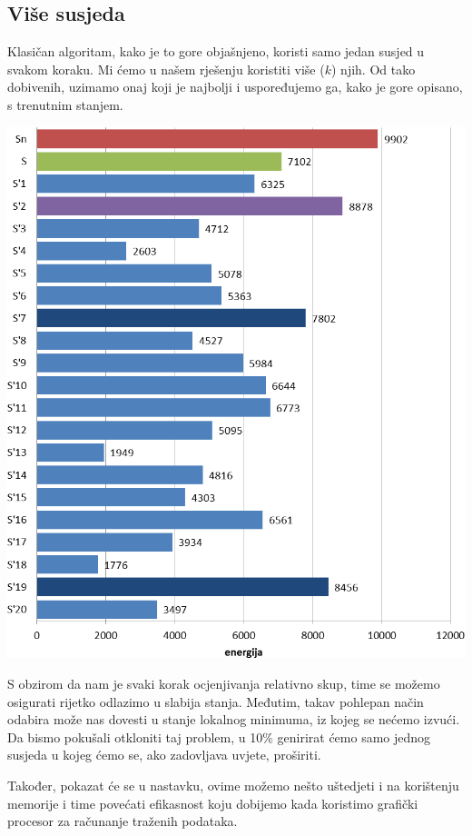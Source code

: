 \documentclass[times, utf8, zavrsni]{fer}
\begin{document}
\subsection{Više susjeda}
Klasičan algoritam, kako je to gore objašnjeno, koristi samo jedan susjed u svakom
koraku. Mi ćemo u našem rješenju koristiti više ($k$) njih. Od tako dobivenih,
uzimamo onaj koji je najbolji i uspoređujemo ga, kako je gore opisano,
s trenutnim stanjem. 

\includegraphics[scale=0.4]{res/energije_susjeda.png}

S obzirom da nam je svaki korak ocjenjivanja relativno skup, time se možemo
osigurati rijetko odlazimo u slabija stanja. Međutim, takav pohlepan
način odabira može nas dovesti u stanje lokalnog minimuma, iz kojeg se nećemo
izvući. Da bismo pokušali otkloniti taj problem, u 10\% genirirat ćemo samo jednog
susjeda u kojeg ćemo se, ako zadovljava uvjete, proširiti. 

Također, pokazat će se u nastavku, ovime možemo nešto uštedjeti i na korištenju
memorije i time povećati efikasnost koju dobijemo kada koristimo grafički
procesor za računanje traženih podataka. 
\end{document}
